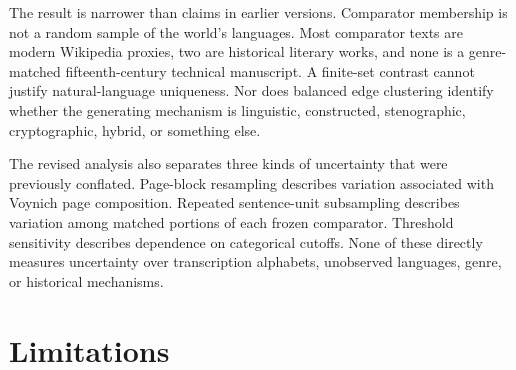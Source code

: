 \documentclass[11pt]{article}
\begin{document}
The result is narrower than claims in earlier versions. Comparator membership
is not a random sample of the world's languages. Most comparator texts are
modern Wikipedia proxies, two are historical literary works, and none is a
genre-matched fifteenth-century technical manuscript. A finite-set contrast
cannot justify natural-language uniqueness. Nor does balanced edge clustering
identify whether the generating mechanism is linguistic, constructed,
stenographic, cryptographic, hybrid, or something else.

The revised analysis also separates three kinds of uncertainty that were
previously conflated. Page-block resampling describes variation associated
with Voynich page composition. Repeated sentence-unit subsampling describes
variation among matched portions of each frozen comparator. Threshold
sensitivity describes dependence on categorical cutoffs. None of these
directly measures uncertainty over transcription alphabets, unobserved
languages, genre, or historical mechanisms.

\section{Limitations}
\end{document}
